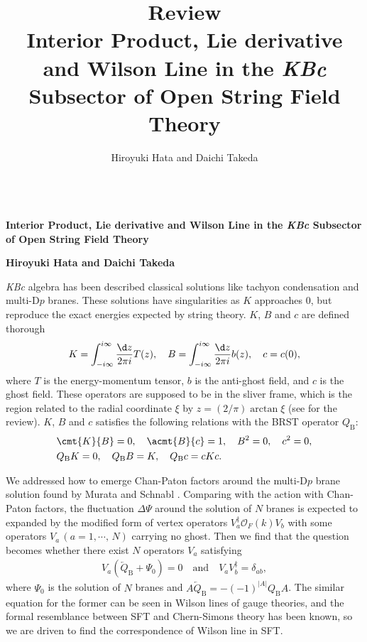 \documentclass[12pt]{article}
\title{\textbf{Review}\\
Interior Product, Lie derivative and Wilson Line in the \textit{KBc} Subsector of Open String Field Theory
}
\author{Hiroyuki Hata and Daichi Takeda}
\date{}
\begin{document}
{\Large{}\\[2mm]
\textbf{Interior Product, Lie derivative and Wilson Line in the \textit{KBc} Subsector of Open String Field Theory
}
}

\noindent
\hfill\textbf{Hiroyuki Hata and Daichi Takeda}

\vspace{12pt}
\textit{KBc} algebra has been described classical solutions like tachyon condensation and multi-$\mathrm{D}p$ branes.
These solutions have singularities as $K$ approaches $0$, but reproduce the exact energies expected by string theory.
$K$, $B$ and $c$ are defined thorough
\begin{align}
	K = \int_{-i\infty}^{i\infty}\frac{\d z}{2\pi i}T(z),\quad
	B =  \int_{-i\infty}^{i\infty}\frac{\d z}{2\pi i}b(z),\quad 
	c = c(0),
\end{align}
where $T$ is the energy-momentum tensor, $b$ is the anti-ghost field, and $c$ is the ghost field.
These operators are supposed to be in the sliver frame, which is the region related to the radial coordinate $\xi$ by $z = (2/\pi)\arctan \xi$ (see \cite{Okawa:2012ica} for the review).
$K$, $B$ and $c$ satisfies the following relations with the BRST operator $Q_\mathrm{B}$:
\begin{align}
	&\cmt{K}{B} = 0,\quad
	\acmt{B}{c} = 1,\quad
	B^2 = 0,\quad
	c^2 = 0,\\
	&Q_\mathrm{B}K = 0,\quad
	Q_\mathrm{B}B = K,\quad
	Q_\mathrm{B}c = cKc.
\end{align}

We addressed how to emerge Chan-Paton factors around the multi-$\mathrm{D}p$ brane solution found by Murata and Schnabl \cite{Murata:2011ex}.
Comparing with the action with Chan-Paton factors, the fluctuation $\Delta\Psi$ around the solution of $N$ branes is expected to expanded by the modified form of vertex operators $V_a^\ddag\mathcal O_F(k) V_b$  with some operators $V_a\,(a = 1,\cdots,\,N)$ carrying no ghost.
Then we find that the question becomes whether there exist $N$ operators $V_a$ satisfying
\begin{align}
	V_a(\overleftarrow Q_\mathrm{B}+\Psi_0) = 0\quad
	\mathrm{and}\quad 
	V_aV_b^\ddag = \delta_{ab},\label{eq:Va_coditions}
\end{align}
where $\Psi_0$ is the solution of $N$ branes and $A\overleftarrow Q_\mathrm{B} = -(-1)^{|A|}Q_\mathrm{B}A$.
The similar equation for the former can be seen in Wilson lines of gauge theories, and the formal resemblance between SFT and Chern-Simons theory has been known,
so we are driven to find the correspondence of Wilson line in SFT.
\end{document}
